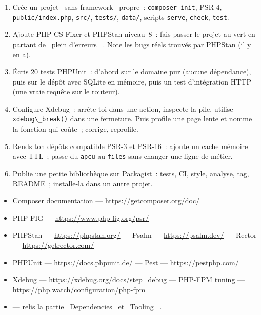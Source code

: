 \begin{exercice}
\begin{enumerate}
  \item Cr\'ee un projet \og ~sans framework~ \fg{} propre~: \verb|composer init|, PSR-4, \verb|public/index.php|,
        \verb|src/|, \verb|tests/|, \verb|data/|, scripts \verb|serve|, \verb|check|, \verb|test|.
  \item Ajoute PHP-CS-Fixer et PHPStan niveau~8~: fais passer le projet au vert en partant de
        \og ~plein d'erreurs~ \fg{}. Note les bugs r\'eels trouv\'es par PHPStan (il y en a).
  \item \'Ecris 20 tests PHPUnit~: d'abord sur le domaine pur (aucune d\'ependance), puis sur le d\'ep\^ot
        avec SQLite en m\'emoire, puis un test d'int\'egration HTTP (une vraie requ\^ete sur le routeur).
  \item Configure Xdebug~: arr\^ete-toi dans une action, inspecte la pile, utilise
        \verb|xdebug\_break()| dans une fermeture. Puis profile une page lente et nomme la fonction
        qui co\^ute~; corrige, reprofile.
  \item Rends ton d\'ep\^ots compatible PSR-3 et PSR-16~: ajoute un cache m\'emoire avec TTL~; passe
        du \verb|apcu| au \verb|files| sans changer une ligne de m\'etier.
  \item Publie une petite biblioth\`eque sur Packagist~: tests, CI, style, analyse, tag, README~;
        installe-la dans un autre projet.
\end{enumerate}
\end{exercice}

\begin{ressources}
\begin{itemize}
  \item Composer documentation --- \url{https://getcomposer.org/doc/}
  \item PHP-FIG --- \url{https://www.php-fig.org/psr/}
  \item PHPStan --- \url{https://phpstan.org/} --- Psalm --- \url{https://psalm.dev/} --- Rector --- \url{https://getrector.com/}
  \item PHPUnit --- \url{https://docs.phpunit.de/} --- Pest --- \url{https://pestphp.com/}
  \item Xdebug --- \url{https://xdebug.org/docs/step_debug} --- PHP-FPM tuning --- \url{https://php.watch/configuration/php-fpm}
  \item {} --- relis la partie \og ~Dependencies~ \fg{} et \og ~Tooling~ \fg{}.
\end{itemize}
\end{ressources}

